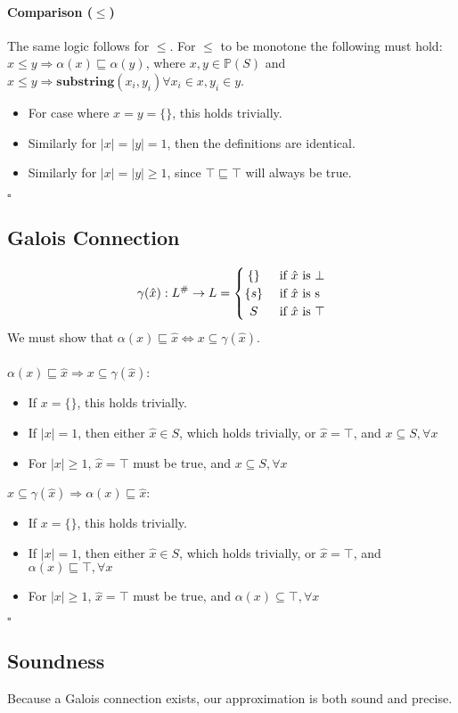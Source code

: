 \documentclass{article}
\newcommand{\powerset}[1]{\mathbb{P}(#1)}
\begin{document}
\paragraph{Comparison ($\leq$)}
The same logic follows for $\leq$. For $\leq$ to be monotone the following must hold: $x \leq y \Rightarrow  \alpha(x) \sqsubseteq \alpha(y)$, where $x,y \in \powerset{S}$ and $x \leq y \Rightarrow \mathbf{substring}(x_i,y_i) \forall x_i \in x, y_i \in y$.
\begin{itemize}
	\item For case where $x = y = \{\}$, this holds trivially.
	\item Similarly for $|x| = |y| = 1$, then the definitions are identical.
	\item Similarly for $|x| = |y| \geq 1$, since $\top \sqsubseteq \top$ will always be true.
\end{itemize}
$\square$

\subsection{Galois Connection}
\[
 \gamma(\hat{x}): L^\# \rightarrow L =
  \begin{cases} 
      \hfill \{\}    \hfill & \text{ if $\hat{x}$ is $\bot$} \\
      \hfill \{s\} \hfill & \text{ if $\hat{x}$ is s} \\
      \hfill S \hfill & \text{ if $\hat{x}$ is $\top$}
  \end{cases}
\]
We must show that $\alpha(x) \sqsubseteq \hat{x} \iff x \subseteq \gamma(\hat{x})$.
\\\\
$\alpha(x) \sqsubseteq \hat{x} \Rightarrow x \subseteq \gamma(\hat{x})$:
\begin{itemize}
	\item If  $x = \{\}$, this holds trivially.
	\item If $|x| = 1$, then either $\hat{x} \in S$, which holds trivially, or $\hat{x} = \top$, and $x \subseteq S, \forall x$ 
	\item For $|x| \geq 1$, $\hat{x} = \top$ must be true, and $x \subseteq S, \forall x$ 
\end{itemize}
$ x \subseteq \gamma(\hat{x}) \Rightarrow \alpha(x) \sqsubseteq \hat{x}$:
\begin{itemize}
	\item If  $x = \{\}$, this holds trivially.
	\item If $|x| = 1$, then either $\hat{x} \in S$, which holds trivially, or $\hat{x} = \top$, and $\alpha(x) \sqsubseteq \top, \forall x$ 
	\item For $|x| \geq 1$, $\hat{x} = \top$ must be true, and $\alpha(x) \subseteq \top, \forall x$ 
\end{itemize}
$\square$

\subsection{Soundness}
Because a Galois connection exists, our approximation is both sound and precise.
\end{document}
